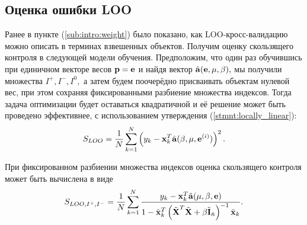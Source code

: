 \subsection{Оценка ошибки LOO}
Ранее в пункте (\ref{sub:intro:weight}) было показано, как LOO-кросс-валидацию можно описать в терминах взвешенных объектов.
Получим оценку скользящего контроля в следующей модели обучения. Предположим, что один раз обучившись при единичном векторе весов $\boldsymbol{\mathbf{p}} = \boldsymbol{\mathbf{e}}$ и найдя вектор $\hat{\boldsymbol{\mathbf{a}}}(\boldsymbol{\mathbf{e}}, {\mu,\beta}),$ мы получили множества $I^+, I^-, I^0,$ а затем будем поочерёдно присваивать объектам нулевой вес, при этом сохраняя фиксированными разбиение множества индексов. Тогда задача оптимизации будет оставаться квадратичной и её решение может быть проведено эффективнее, с использованием утверждения (\ref{stmnt:locally_linear}):
\begin{equation}
	S_{LOO} = \frac1N\sum\limits_{k=1}^N \left(y_k - \boldsymbol{\mathbf{x}}_k^T\hat{\boldsymbol{\mathbf{a}}}(\beta, \mu, \boldsymbol{\mathbf{e}}^{(i)})\right)^2.
\end{equation}




\begin{statement}
При фиксированном разбиении множества индексов оценка скользящего контроля может быть вычислена в виде
\begin{equation*}
	S_{LOO, I^+, I^-} = \frac1N\sum\limits_{k=1}^N\frac{y_k - \boldsymbol{\mathbf{x}}_k^T\hat{\boldsymbol{\mathbf{a}}}({\mu,\beta}, \boldsymbol{\mathbf{e}})}{1 - \tilde{\boldsymbol{\mathbf{x}}}_k^T\left(\tilde{\boldsymbol{\mathbf{X}}}^T\tilde{\boldsymbol{\mathbf{X}}} + \beta \tilde{\boldsymbol{\mathbf{I}}}_{\hat n}\right)^{-1}\tilde{\boldsymbol{\mathbf{x}}}_k}.
\end{equation*}
\end{statement}

